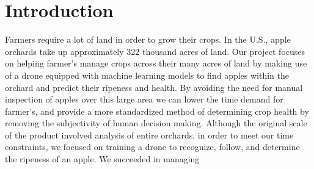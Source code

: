 \section{Introduction}
Farmers require a lot of land in order to grow their crops.  %
In the U.S., apple orchards take up approximately 322 thousand acres of land. %
Our project focuses on helping farmer's manage crops across their many acres of land by making use of a drone equipped with machine learning models to 
find apples within the orchard and predict their ripeness and health. By avoiding the need for manual inspection of apples over this large area 
we can lower the time demand for farmer's, and provide a more standardized method of determining crop health by removing the subjectivity of human decision making.
Although the original scale of the product involved analysis of entire orchards, in order to meet our time constraints, we focused on training a drone to recognize, follow, and determine the ripeness of an apple. We succeeded in managing 
\\
